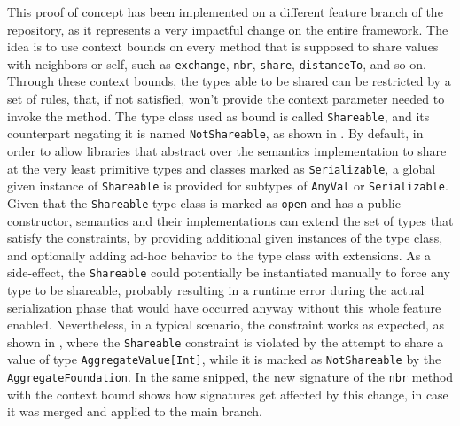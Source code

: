 This proof of concept has been implemented on a different feature branch of the repository, as it represents a very impactful change on the entire framework.
%
The idea is to use context bounds on every method that is supposed to share values with neighbors or self, such as \texttt{exchange}, \texttt{nbr}, \texttt{share}, \texttt{distanceTo}, and so on.
%
Through these context bounds, the types able to be shared can be restricted by a set of rules, that, if not satisfied, won't provide the context parameter needed to invoke the method.
%
The type class used as bound is called \texttt{Shareable}, and its counterpart negating it is named \texttt{NotShareable}, as shown in .
%
By default, in order to allow libraries that abstract over the semantics implementation to share at the very least primitive types and classes marked as \texttt{Serializable}, a global given instance of \texttt{Shareable} is provided for subtypes of \texttt{AnyVal} or \texttt{Serializable}.
%
Given that the \texttt{Shareable} type class is marked as \texttt{open} and has a public constructor, semantics and their implementations can extend the set of types that satisfy the constraints, by providing additional given instances of the type class, and optionally adding ad-hoc behavior to the type class with extensions.
%
As a side-effect, the \texttt{Shareable} could potentially be instantiated manually to force any type to be shareable, probably resulting in a runtime error during the actual serialization phase that would have occurred anyway without this whole feature enabled.
%
Nevertheless, in a typical scenario, the constraint works as expected, as shown in , where the \texttt{Shareable} constraint is violated by the attempt to share a value of type \texttt{AggregateValue[Int]}, while it is marked as \texttt{NotShareable} by the \texttt{AggregateFoundation}.
%
In the same snipped, the new signature of the \texttt{nbr} method with the context bound shows how signatures get affected by this change, in case it was merged and applied to the main branch.






